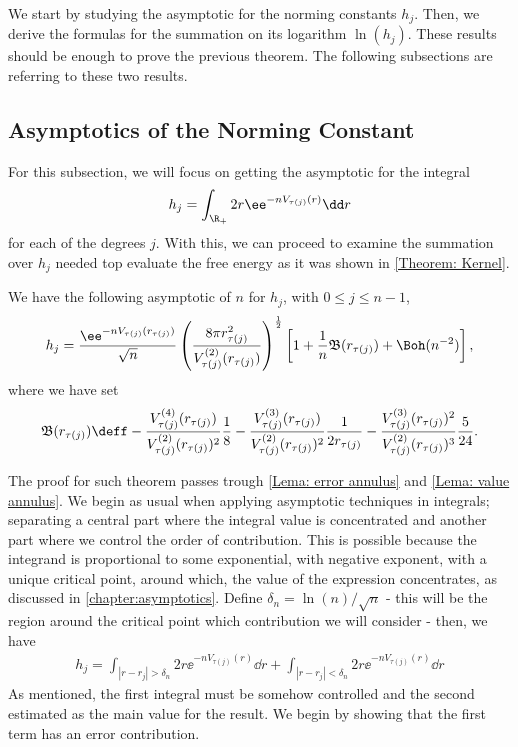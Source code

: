 We start by studying the asymptotic for the norming constants $h_j$. Then, we derive the formulas for the summation on its logarithm $\ln(h_j)$. These results should be enough to prove the previous theorem. The following subsections are referring to these two results.

\subsection{Asymptotics of the Norming Constant}

For this subsection, we will focus on getting the asymptotic for the integral
\begin{equation}
	h_j = \int_{\R_+} 2r \ee^{-n V_{\tau(j)}(r)} \dd r
\end{equation}
for each of the degrees $j$. With this, we can proceed to examine the summation over $h_j$ needed top evaluate the free energy as it was shown in \autoref{Theorem: Kernel}.


\begin{teorema}	\label{Theorem: hj annulus}
	We have the following asymptotic of $n$ for $h_j$, with $0 \leq j \leq n-1$,
	\begin{equation}
		h_j = \frac{\ee^{-n V_{\tau(j)}(r_{\tau(j)})}}{\sqrt{n}} \left( \frac{8\pi r_{\tau(j)}^2}{V^{(2)}_{\tau(j)}(r_{\tau(j)})} \right)^{\frac{1}{2}} \left[ 1 + \frac{1}{n} \mathfrak{B}(r_{\tau(j)}) + \Boh(n^{-2}) \right],
		\label{Equation: Asymptotic hj annulus}
	\end{equation}
	where we have set 
	\begin{equation}
		\mathfrak{B}(r_{\tau(j)}) \deff -\frac{V^{(4)}_{\tau(j)}(r_{\tau(j)})}{V^{(2)}_{\tau(j)}(r_{\tau(j)})^2} \frac{1}{8} - \frac{V^{(3)}_{\tau(j)}(r_{\tau(j)})}{V^{(2)}_{\tau(j)}(r_{\tau(j)})^{2}} \frac{1}{2 r_{\tau(j)}} - \frac{V^{(3)}_{\tau(j)}(r_{\tau(j)})^2}{V^{(2)}_{\tau(j)}(r_{\tau(j)})^{3}} \frac{5}{24}.
	\end{equation}
\end{teorema}

The proof for such theorem passes trough \autoref{Lema: error annulus} and \autoref{Lema: value annulus}. We begin as usual when applying asymptotic techniques in integrals; separating a central part where the integral value is concentrated and another part where we control the order of contribution. This is possible because the integrand is proportional to some exponential, with negative exponent, with a unique critical point, around which, the value of the expression concentrates, as discussed in \autoref{chapter:asymptotics}. Define $\delta_n = \ln(n)/\sqrt{n}$ - this will be the region around the critical point which contribution we will consider - then, we have
\begin{align}
	h_j =  \int_{|r - r_j| > \delta_n} 2r \ee^{-n V_{\tau(j)}(r)} \dd r + \int_{|r - r_j| < \delta_n} 2r \ee^{-n V_{\tau(j)}(r)} \dd r
	\label{Equation: Separation annulus}
\end{align}
As mentioned, the first integral must be somehow controlled and the second estimated as the main value for the result.  We begin by showing that the first term has an error contribution.

